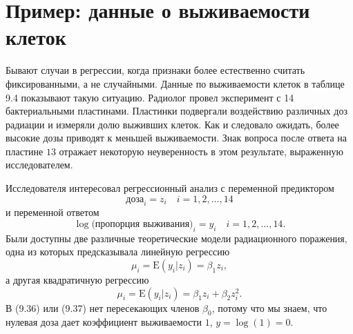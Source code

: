 \section{Пример: данные о выживаемости клеток}

Бывают случаи в регрессии, когда признаки более естественно считать фиксированными, а не случайными. Данные по выживаемости клеток в таблице 9.4 показывают такую ситуацию. Радиолог провел эксперимент с 14 бактериальными пластинами. Пластинки подвергали воздействию различных доз радиации и измеряли долю выживших клеток. Как и следовало ожидать, более высокие дозы приводят к меньшей выживаемости. Знак вопроса после ответа на пластине $13$ отражает некоторую неуверенность в этом результате, выраженную исследователем.

Исследователя интересовал регрессионный анализ с переменной предиктором
\begin{equation}
	\text{доза}_i = z_i \quad i = 1,2, \ldots,14
\end{equation}
и переменной ответом
\begin{equation}
	\log \text{(пропорция выживания)}_i = y_i \quad i=1,2,\ldots,14.
\end{equation}
Были доступны две различные теоретические модели радиационного поражения, одна из которых предсказывала линейную регрессию
\begin{equation}
	\mu_i = \text{E}(y_i|z_i) = \beta_1 z_i,
\end{equation}
а другая квадратичную регрессию
\begin{equation}
	\mu_i = \text{E}(y_i|z_i) = \beta_1 z_i + \beta_2 z_i^2.
\end{equation}
В (9.36) или (9.37) нет пересекающих членов $\beta_0$, потому что мы знаем, что нулевая доза дает коэффициент выживаемости $1$, $y = \log (1) = 0$.

